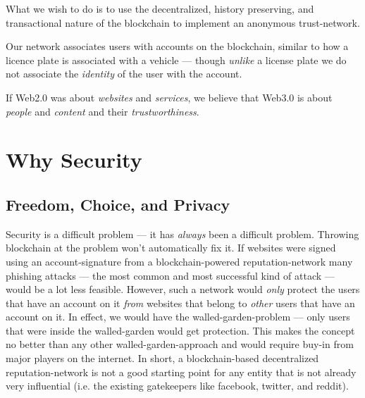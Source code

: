 \documentclass[a4paper]{article}
\begin{document}
What we wish to do is to use the decentralized, history preserving, and
transactional nature of the blockchain to implement an anonymous
trust-network.

Our network associates users with accounts on the blockchain, similar to
how a licence plate is associated with a vehicle --- though \emph{
unlike} a license plate we do not associate the \emph{identity} of
the user with the account.

If Web2.0 was about \emph{websites} and \emph{services}, we believe
that Web3.0 is about \emph{people} and \emph{content} and their
\emph{trustworthiness}.

\section{Why Security}
\subsection{Freedom, Choice, and Privacy}
Security is a difficult problem --- it has \emph{always} been a
difficult problem. Throwing blockchain at the problem won't
automatically fix it. If websites were signed using an account-signature
from a blockchain-powered reputation-network many phishing attacks ---
the most common and most successful kind of attack --- would be a lot
less feasible. However, such a network would \emph{only} protect the
users that have an account on it \emph{from} websites that belong to
\emph{other} users that have an account on it. In effect, we would
have the walled-garden-problem --- only users that were inside the
walled-garden would get protection. This makes the concept no better
than any other walled-garden-approach and would require buy-in from
major players on the internet. In short, a blockchain-based
decentralized reputation-network is not a good starting point for any
entity that is not already very influential (i.e. the existing
gatekeepers like facebook, twitter, and reddit).
\end{document}
